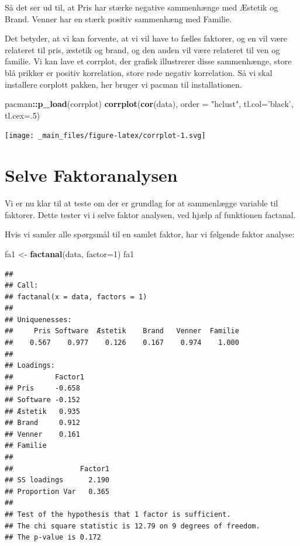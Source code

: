 \documentclass[]{book}
\newenvironment{Shaded}{\begin{snugshade}}{\end{snugshade}}
\newcommand{\DataTypeTok}[1]{\textcolor[rgb]{0.13,0.29,0.53}{#1}}
\newcommand{\DecValTok}[1]{\textcolor[rgb]{0.00,0.00,0.81}{#1}}
\newcommand{\KeywordTok}[1]{\textcolor[rgb]{0.13,0.29,0.53}{\textbf{#1}}}
\newcommand{\NormalTok}[1]{#1}
\newcommand{\OperatorTok}[1]{\textcolor[rgb]{0.81,0.36,0.00}{\textbf{#1}}}
\newcommand{\StringTok}[1]{\textcolor[rgb]{0.31,0.60,0.02}{#1}}
\begin{document}
Så det ser ud til, at Pris har stærke negative sammenhænge med Æstetik og Brand.
Venner har en stærk positiv sammenhæng med Familie.

Det betyder, at vi kan forvente, at vi vil have to fælles faktorer, og en vil være relateret til pris, æstetik og brand, og den anden vil være relateret til ven og familie. Vi kan lave et corrplot, der grafisk illustrerer disse sammenhænge, store blå prikker er positiv korrelation, store røde negativ korrelation. Så vi skal installere corplott pakken, her bruger vi pacman til installationen.

\begin{Shaded}
\begin{Highlighting}[]
\NormalTok{pacman}\OperatorTok{::}\KeywordTok{p_load}\NormalTok{(corrplot)}
\KeywordTok{corrplot}\NormalTok{(}\KeywordTok{cor}\NormalTok{(data), }\DataTypeTok{order =} \StringTok{"hclust"}\NormalTok{, }\DataTypeTok{tl.col=}\StringTok{'black'}\NormalTok{, }\DataTypeTok{tl.cex=}\NormalTok{.}\DecValTok{5}\NormalTok{)}
\end{Highlighting}
\end{Shaded}

\texttt{[image: \_main\_files/figure-latex/corrplot-1.svg]}

\hypertarget{selve-faktoranalysen}{%
\section{Selve Faktoranalysen}\label{selve-faktoranalysen}}

Vi er nu klar til at teste om der er grundlag for at sammenlægge variable til faktorer. Dette tester vi i selve faktor analysen, ved hjælp af funktionen factanal.

Hvis vi samler alle spørgsmål til en samlet faktor, har vi følgende faktor analyse:

\begin{Shaded}
\begin{Highlighting}[]
\NormalTok{fa1 <-}\StringTok{ }\KeywordTok{factanal}\NormalTok{(data, }\DataTypeTok{factor=}\DecValTok{1}\NormalTok{)}
\NormalTok{fa1}
\end{Highlighting}
\end{Shaded}

\begin{verbatim}
## 
## Call:
## factanal(x = data, factors = 1)
## 
## Uniquenesses:
##     Pris Software  Æstetik    Brand   Venner  Familie 
##    0.567    0.977    0.126    0.167    0.974    1.000 
## 
## Loadings:
##          Factor1
## Pris     -0.658 
## Software -0.152 
## Æstetik   0.935 
## Brand     0.912 
## Venner    0.161 
## Familie         
## 
##                Factor1
## SS loadings      2.190
## Proportion Var   0.365
## 
## Test of the hypothesis that 1 factor is sufficient.
## The chi square statistic is 12.79 on 9 degrees of freedom.
## The p-value is 0.172
\end{verbatim}
\end{document}
